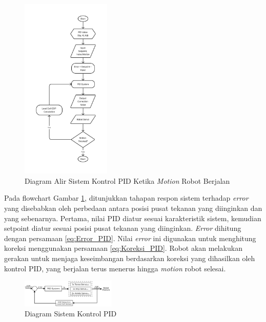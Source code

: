 \begin{enumerate}[label=\Alph*.]
    \begin{figure} [h] \centering
      \includegraphics[width=0.38\textwidth]{gambar/Flow_Kontrol.png}
      \caption{Diagram Alir Sistem Kontrol PID Ketika \textit{Motion} Robot Berjalan}
      \label{fig:Flow_Kontrol}
    \end{figure}
    
    \hspace*{1em} Pada flowchart Gambar \ref{fig:Flow_Kontrol}, ditunjukkan tahapan respon sistem terhadap \textit{error} yang disebabkan oleh perbedaan antara posisi pusat tekanan yang diinginkan dan yang sebenarnya. Pertama, nilai PID diatur sesuai karakteristik sistem, kemudian setpoint diatur sesuai posisi pusat tekanan yang diinginkan. \textit{Error} dihitung dengan persamaan \ref{eq:Error_PID}. Nilai \textit{error} ini digunakan untuk menghitung koreksi menggunakan persamaan \ref{eq:Koreksi_PID}. Robot akan melakukan gerakan untuk menjaga keseimbangan berdasarkan koreksi yang dihasilkan oleh kontrol PID, yang berjalan terus menerus hingga \textit{motion} robot selesai.

    \begin{figure} [h] \centering
      \includegraphics[width=0.4\textwidth]{gambar/pid_diagram.png}
      \caption{Diagram Sistem Kontrol PID}
      \label{fig:Control_System}
    \end{figure}


\end{enumerate}
